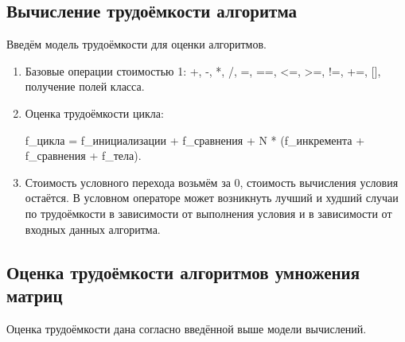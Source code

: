 \subsection{Вычисление трудоёмкости алгоритма}
Введём модель трудоёмкости для оценки алгоритмов.
\begin{enumerate}
  	\item Базовые операции стоимостью 1: +, -, *, /, =, ==, <=, >=, !=, +=, [], получение полей класса.
	\item Оценка трудоёмкости цикла: 
	
	f\_цикла = f\_инициализации + f\_сравнения + N * (f\_инкремента + f\_сравнения + f\_тела).
	
	\item Стоимость условного перехода возьмём за 0, стоимость вычисления условия остаётся. В условном операторе может возникнуть лучший и худший случаи по трудоёмкости в зависимости от выполнения условия и в зависимости от входных данных алгоритма.
\end{enumerate}

\subsection{Оценка трудоёмкости алгоритмов умножения матриц}
Оценка трудоёмкости дана согласно введённой выше модели вычислений.

